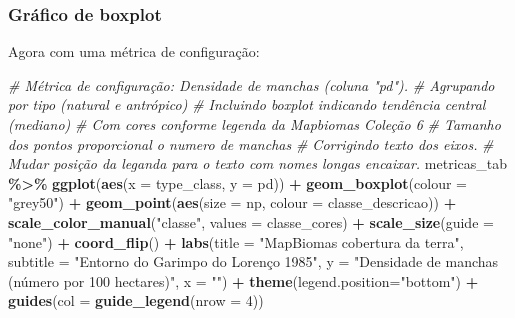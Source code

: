 \documentclass[
]{article}
\newenvironment{Shaded}{\begin{snugshade}}{\end{snugshade}}
\newcommand{\AttributeTok}[1]{\textcolor[rgb]{0.13,0.29,0.53}{#1}}
\newcommand{\CommentTok}[1]{\textcolor[rgb]{0.56,0.35,0.01}{\textit{#1}}}
\newcommand{\DecValTok}[1]{\textcolor[rgb]{0.00,0.00,0.81}{#1}}
\newcommand{\FunctionTok}[1]{\textcolor[rgb]{0.13,0.29,0.53}{\textbf{#1}}}
\newcommand{\NormalTok}[1]{#1}
\newcommand{\SpecialCharTok}[1]{\textcolor[rgb]{0.81,0.36,0.00}{\textbf{#1}}}
\newcommand{\StringTok}[1]{\textcolor[rgb]{0.31,0.60,0.02}{#1}}
\begin{document}
\hypertarget{gruxe1fico-de-boxplot}{%
\subsubsection{Gráfico de boxplot}\label{gruxe1fico-de-boxplot}}

Agora com uma métrica de configuração:

\begin{Shaded}
\begin{Highlighting}[]
\CommentTok{\# Métrica de configuração: Densidade de manchas (coluna "pd").}
\CommentTok{\# Agrupando por tipo (natural e antrópico)}
\CommentTok{\# Incluindo boxplot indicando tendência central (mediano)}
\CommentTok{\# Com cores conforme legenda da Mapbiomas Coleção 6}
\CommentTok{\# Tamanho dos pontos proporcional o numero de manchas}
\CommentTok{\# Corrigindo texto dos eixos.}
\CommentTok{\# Mudar posição da leganda para o texto com nomes longas encaixar.}
\NormalTok{metricas\_tab }\SpecialCharTok{\%\textgreater{}\%} 
\FunctionTok{ggplot}\NormalTok{(}\FunctionTok{aes}\NormalTok{(}\AttributeTok{x =}\NormalTok{ type\_class, }\AttributeTok{y =}\NormalTok{ pd)) }\SpecialCharTok{+} 
\FunctionTok{geom\_boxplot}\NormalTok{(}\AttributeTok{colour =} \StringTok{"grey50"}\NormalTok{) }\SpecialCharTok{+}
\FunctionTok{geom\_point}\NormalTok{(}\FunctionTok{aes}\NormalTok{(}\AttributeTok{size =}\NormalTok{ np, }\AttributeTok{colour =}\NormalTok{ classe\_descricao)) }\SpecialCharTok{+} 
\FunctionTok{scale\_color\_manual}\NormalTok{(}\StringTok{"classe"}\NormalTok{, }\AttributeTok{values =}\NormalTok{ classe\_cores) }\SpecialCharTok{+}
\FunctionTok{scale\_size}\NormalTok{(}\AttributeTok{guide =} \StringTok{"none"}\NormalTok{) }\SpecialCharTok{+}
\FunctionTok{coord\_flip}\NormalTok{() }\SpecialCharTok{+} 
\FunctionTok{labs}\NormalTok{(}\AttributeTok{title =} \StringTok{"MapBiomas cobertura da terra"}\NormalTok{, }
\AttributeTok{subtitle =} \StringTok{"Entorno do Garimpo do Lorenço 1985"}\NormalTok{,}
\AttributeTok{y =} \StringTok{"Densidade de manchas (número por 100 hectares)"}\NormalTok{, }
\AttributeTok{x =} \StringTok{""}\NormalTok{) }\SpecialCharTok{+} 
\FunctionTok{theme}\NormalTok{(}\AttributeTok{legend.position=}\StringTok{"bottom"}\NormalTok{) }\SpecialCharTok{+} 
\FunctionTok{guides}\NormalTok{(}\AttributeTok{col =} \FunctionTok{guide\_legend}\NormalTok{(}\AttributeTok{nrow =} \DecValTok{4}\NormalTok{)) }
\end{Highlighting}
\end{Shaded}
\end{document}
